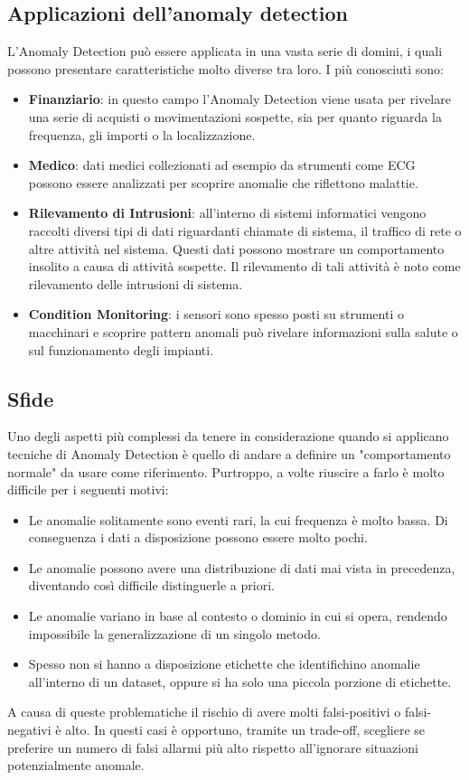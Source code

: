 \subsection{Applicazioni dell'anomaly detection}
L'Anomaly Detection può essere applicata in una vasta serie di domini, i quali possono presentare caratteristiche molto diverse tra loro. I più conosciuti sono:
\begin{itemize}
	\item \textbf{Finanziario}: in questo campo l'Anomaly Detection viene usata per rivelare una serie di acquisti o movimentazioni sospette, sia per quanto riguarda la frequenza, gli importi o la localizzazione.
	\item \textbf{Medico}: dati medici collezionati ad esempio da strumenti come ECG possono essere analizzati per scoprire anomalie che riflettono malattie.
	\item \textbf{Rilevamento di Intrusioni}: all'interno di sistemi informatici vengono raccolti diversi tipi di dati riguardanti chiamate di sistema, il traffico di rete o altre attività nel sistema. Questi dati possono mostrare un comportamento insolito a causa di attività sospette. Il rilevamento di tali attività è noto come rilevamento delle intrusioni di sistema.
	\item \textbf{Condition Monitoring}: i sensori sono spesso posti su strumenti o macchinari e scoprire pattern anomali può rivelare informazioni sulla salute o sul funzionamento degli impianti.
\end{itemize}

\subsection{Sfide}
Uno degli aspetti più complessi da tenere in considerazione quando si applicano tecniche di Anomaly Detection è quello di andare a definire un "comportamento normale" da usare come riferimento. Purtroppo, a volte riuscire a farlo è molto difficile per i seguenti motivi:
\begin{itemize}
	\item Le anomalie solitamente sono eventi rari, la cui frequenza è molto bassa. Di conseguenza i dati a disposizione possono essere molto pochi.
	\item Le anomalie possono avere una distribuzione di dati mai vista in precedenza, diventando così difficile distinguerle a priori.
	\item Le anomalie variano in base al contesto o dominio in cui si opera, rendendo impossibile la generalizzazione di un singolo metodo.
	\item Spesso non si hanno a disposizione etichette che identifichino anomalie all'interno di un dataset, oppure si ha solo una piccola porzione di etichette.
\end{itemize}
A causa di queste problematiche il rischio di avere molti falsi-positivi o falsi-negativi è alto. In questi casi è opportuno, tramite un trade-off, scegliere se preferire un numero di falsi allarmi più alto rispetto all'ignorare situazioni potenzialmente anomale.

